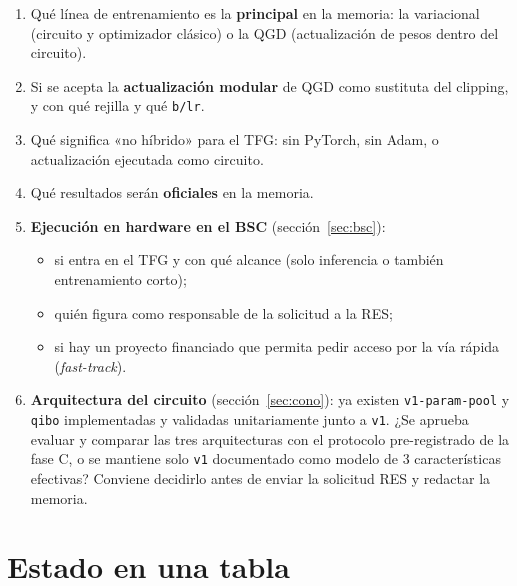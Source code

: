 \documentclass[11pt,a4paper]{article}
\begin{document}
\begin{keybox}
\begin{enumerate}[leftmargin=*]
  \item Qué línea de entrenamiento es la \textbf{principal} en la memoria: la variacional (circuito y optimizador
        clásico) o la QGD (actualización de pesos dentro del circuito).
  \item Si se acepta la \textbf{actualización modular} de QGD como sustituta del clipping, y con qué rejilla y qué
        \texttt{b/lr}.
  \item Qué significa «no híbrido» para el TFG: sin PyTorch, sin Adam, o actualización ejecutada como circuito.
  \item Qué resultados serán \textbf{oficiales} en la memoria.
  \item \textbf{Ejecución en hardware en el BSC} (sección~\ref{sec:bsc}):
  \begin{itemize}
    \item si entra en el TFG y con qué alcance (solo inferencia o también entrenamiento corto);
    \item quién figura como responsable de la solicitud a la RES;
    \item si hay un proyecto financiado que permita pedir acceso por la vía rápida (\textit{fast-track}).
  \end{itemize}
  \item \textbf{Arquitectura del circuito} (sección~\ref{sec:cono}): ya existen \texttt{v1-param-pool} y \texttt{qibo}
        implementadas y validadas unitariamente junto a \texttt{v1}. ¿Se aprueba evaluar y comparar las tres
        arquitecturas con el protocolo pre-registrado de la fase C, o se mantiene solo \texttt{v1} documentado como
        modelo de 3 características efectivas? Conviene decidirlo antes de enviar la solicitud RES y redactar la memoria.
\end{enumerate}
\end{keybox}

\section{Estado en una tabla}
\end{document}
